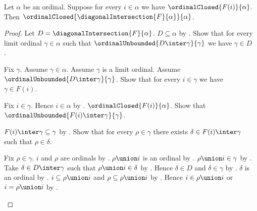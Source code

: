\begin{proposition}\label{diagonal_intersection_closed}
    Let $\alpha$ be an ordinal.
    Suppose for every $i\in\alpha$ we have
        $\ordinalClosed{F(i)}{\alpha}$.
    Then $\ordinalClosed{\diagonalIntersection{F}{\alpha}}{\alpha}$.
\end{proposition}
\begin{proof}
    Let $D=\diagonalIntersection{F}{\alpha}$.
    $D\subseteq\alpha$ by .
    Show that for every limit ordinal $\gamma\in\alpha$ such that
        $\ordinalUnbounded{D\inter\gamma}{\gamma}$
        we have $\gamma\in D$.
    \begin{subproof}
        Fix $\gamma$.
        Assume $\gamma\in\alpha$.
        Assume $\gamma$ is a limit ordinal.
        Assume $\ordinalUnbounded{D\inter\gamma}{\gamma}$.
        Show that for every $i\in\gamma$ we have $\gamma\in F(i)$.
        \begin{subproof}
            Fix $i\in\gamma$.
            Hence $i\in\alpha$ by .
            $\ordinalClosed{F(i)}{\alpha}$.
            Show that $\ordinalUnbounded{F(i)\inter\gamma}{\gamma}$.
            \begin{subproof}
                $F(i)\inter\gamma\subseteq\gamma$
                    by .
                Show that for every $\rho\in\gamma$ there exists
                    $\delta\in F(i)\inter\gamma$ such that
                    $\rho\in\delta$.
                \begin{subproof}
                    Fix $\rho\in\gamma$.
                    $i$ and $\rho$ are ordinals
                        by .
                    $\rho\union i$ is an ordinal
                        by .
                    $\rho\union i\in\gamma$ by .
                    Take $\delta\in D\inter\gamma$ such that
                        $\rho\union i\in\delta$ by .
                    Hence $\delta\in D$ and $\delta\in\gamma$
                        by .
                    $\delta$ is an ordinal
                        by .
                    $i\subseteq\rho\union i$ and $\rho\subseteq\rho\union i$
                        by .
                    Hence $i\in\rho\union i$ or $i=\rho\union i$
                        by .

\end{subproof}
\end{subproof}
\end{subproof}
\end{subproof}
\end{proof}
